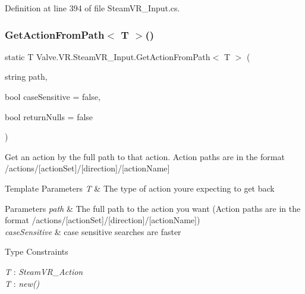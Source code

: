 Definition at line 394 of file Steam\+V\+R\+\_\+\+Input.\+cs.

\mbox{\label{class_valve_1_1_v_r_1_1_steam_v_r___input_af951439eb937586e0f5975a8ee160af3}} 
\subsubsection{\texorpdfstring{GetActionFromPath$<$ T $>$()}{GetActionFromPath< T >()}}
{\footnotesize\ttfamily static T Valve.\+V\+R.\+Steam\+V\+R\+\_\+\+Input.\+Get\+Action\+From\+Path$<$ T $>$ (\begin{DoxyParamCaption}\item[{string}]{path,  }\item[{bool}]{case\+Sensitive = {\ttfamily false},  }\item[{bool}]{return\+Nulls = {\ttfamily false} }\end{DoxyParamCaption})\hspace{0.3cm}{\ttfamily [static]}}



Get an action by the full path to that action. Action paths are in the format /actions/\mbox{[}action\+Set\mbox{]}/\mbox{[}direction\mbox{]}/\mbox{[}action\+Name\mbox{]} 


\begin{DoxyTemplParams}{Template Parameters}
{\em T} & The type of action you\textquotesingle{}re expecting to get back\\
\hline
\end{DoxyTemplParams}

\begin{DoxyParams}{Parameters}
{\em path} & The full path to the action you want (Action paths are in the format /actions/\mbox{[}action\+Set\mbox{]}/\mbox{[}direction\mbox{]}/\mbox{[}action\+Name\mbox{]})\\
\hline
{\em case\+Sensitive} & case sensitive searches are faster\\
\hline
\end{DoxyParams}
\begin{Desc}
\item[Type Constraints]\begin{description}
\item[{\em T} : {\em Steam\+V\+R\+\_\+\+Action}]\item[{\em T} : {\em new()}]\end{description}
\end{Desc}


